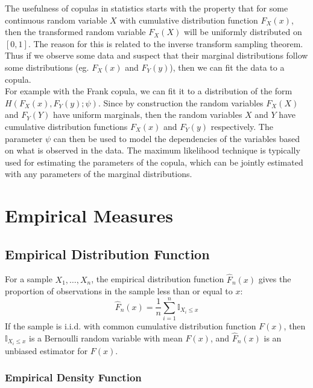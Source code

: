 \documentclass[11pt]{report} %
\begin{document}
The usefulness of copulas in statistics starts with the property that for some continuous random variable $X$ with cumulative distribution function $F_{X}\left(x\right)$, then the transformed random variable $F_{X}\left(X\right)$ will be uniformly distributed on $\left[0, 1\right]$. The reason for this is related to the inverse transform sampling theorem. Thus if we observe some data and suspect that their marginal distributions follow some distributions (eg. $F_{X}\left(x\right)$ and $F_{Y}\left(y\right)$), then we can fit the data to a copula. \\

For example with the Frank copula, we can fit it to a distribution of the form $H\left(F_{X}\left(x\right), F_{Y}\left(y\right); \psi\right)$. Since by construction the random variables $F_{X}\left(X\right)$ and $F_{Y}\left(Y\right)$ have uniform marginals, then the random variables $X$ and $Y$ have cumulative distribution functions $F_{X}\left(x\right)$ and $F_{Y}\left(y\right)$ respectively. The parameter $\psi$ can then be used to model the dependencies of the variables based on what is observed in the data. The maximum likelihood technique is typically used for estimating the parameters of the copula, which can be jointly estimated with any parameters of the marginal distributions.

\section{Empirical Measures}

\subsection{Empirical Distribution Function}

For a sample $X_{1}, \dots, X_{n}$, the empirical distribution function $\widehat{F}_{n}\left(x\right)$ gives the proportion of observations in the sample less than or equal to $x$:
\begin{equation}
\widehat{F}_{n}\left(x\right) = \dfrac{1}{n}\sum_{i = 1}^{n}\mathbb{I}_{X_{i} \leq x}
\end{equation}
If the sample is i.i.d. with common cumulative distribution function $F\left(x\right)$, then $\mathbb{I}_{X_{i} \leq x}$ is a Bernoulli random variable with mean $F\left(x\right)$, and $\widehat{F}_{n}\left(x\right)$ is an unbiased estimator for $F\left(x\right)$.

\subsubsection{Empirical Density Function}
\end{document}
